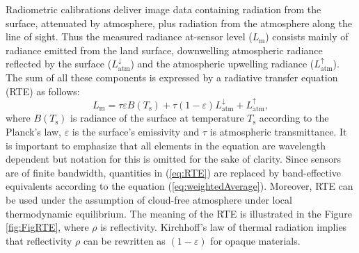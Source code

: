 Radiometric calibrations deliver image data containing radiation from the surface, attenuated by atmosphere, plus radiation from the atmosphere along the line of sight. Thus the measured radiance at-sensor level ($L_\mathrm{m}$) consists mainly of radiance emitted from the land surface, downwelling atmospheric radiance reflected by the surface ($L^\downarrow_\mathrm{atm}$) and the atmospheric upwelling radiance ($L^\uparrow_\mathrm{atm}$). The sum of all these components is expressed by a radiative transfer equation (RTE) as follows:
\begin{equation} 
\label{eq:RTE}
L_\mathrm{m} = \tau \varepsilon B(T_\mathrm{s}) + \tau (1 - \varepsilon) L^\downarrow_\mathrm{atm} + L^\uparrow_\mathrm{atm},
\end{equation}
where $B(T_\mathrm{s})$ is radiance of the surface at temperature $T_\mathrm{s}$ according to the Planck's law, $\varepsilon$ is the surface's emissivity and $\tau$ is atmospheric transmittance. It is important to emphasize that all elements in the equation are wavelength dependent but notation for this is omitted for the sake of clarity. Since sensors are of finite bandwidth, quantities in (\ref{eq:RTE}) are replaced by band-effective equivalents according to the equation (\ref{eq:weightedAverage}). Moreover, RTE can be used under the assumption of cloud-free atmosphere under local thermodynamic equilibrium. The meaning of the RTE is illustrated in the Figure \ref{fig:FigRTE}, where $\rho$ is reflectivity. Kirchhoff's law of thermal radiation implies that reflectivity $\rho$ can be rewritten as $(1 - \varepsilon)$ for opaque materials.

